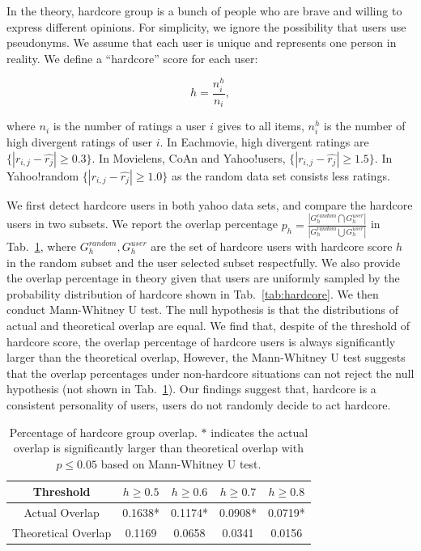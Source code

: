 \documentclass[sigconf]{acmart}
\begin{document}
In the theory, hardcore group is a bunch of people who are brave and willing to express different opinions. For simplicity, we ignore the possibility that users use pseudonyms. We assume that each user is unique and represents one person in reality. We define a ``hardcore'' score for each user:

\begin{equation}
h=\frac{n^h_i}{n_i},
\end{equation}

\noindent where $n_i$ is the number of ratings a user $i$ gives to all items, $n^h_i$ is the number of high divergent ratings of user $i$. In Eachmovie, high divergent ratings are $\{|r_{i,j}-\hat{r_{j}}|\geq 0.3\}$. In Movielens, CoAn and Yahoo!users, $\{|r_{i,j}-\hat{r_{j}}|\geq 1.5\}$. In Yahoo!random $\{|r_{i,j}-\hat{r_{j}}|\geq 1.0\}$ as the random data set consists less ratings. 

We first detect hardcore users in both yahoo data sets, and compare the hardcore users in two subsets. We report the overlap percentage $p_h=\frac{|G_{h}^{random}\bigcap G_{h}^{user}|}{|G_{h}^{random}\bigcup G_{h}^{user}|}$ in Tab.~\ref{tab:overlap}, where $G_{h}^{random},G_{h}^{user}$ are the set of hardcore users with hardcore score $h$ in the random subset and the user selected subset respectfully. We also provide the overlap percentage in theory given that users are uniformly sampled by the probability distribution of hardcore shown in Tab.~\ref{tab:hardcore}. We then conduct Mann-Whitney U test. The null hypothesis is that the distributions of actual and theoretical overlap are equal. We find that, despite of the threshold of hardcore score, the overlap percentage of hardcore users is always significantly larger than the theoretical overlap, However, the Mann-Whitney U test suggests that the overlap percentages under non-hardcore situations can not reject the null hypothesis (not shown in Tab.~\ref{tab:overlap}). Our findings suggest that, hardcore is a consistent personality of users, users do not randomly decide to act hardcore. 


\begin{table}[htbp]
\centering
\small
\caption{Percentage of hardcore group overlap. $*$ indicates the actual overlap is significantly larger than theoretical overlap with $p\leq 0.05$ based on Mann-Whitney U test.}\label{tab:overlap}
\centering
\begin{tabular}{|c|c|c|c|c|}
\hline
 Threshold & $h\geq 0.5$ & $h\geq 0.6$ & $h \geq 0.7$ & $h\geq 0.8$ \\\hline\hline
Actual Overlap& 0.1638* &	0.1174* &	0.0908* & 0.0719* \\\hline
Theoretical Overlap & 0.1169 &  0.0658 &  0.0341 & 0.0156\\
\hline
\end{tabular}
\end{table}
\end{document}
